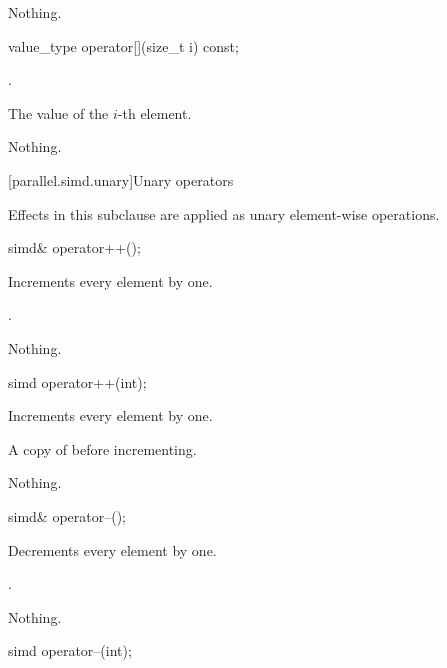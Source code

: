\begin{itemdescr}
\begin{itemdescr}
\begin{itemdescr}
  \throws Nothing.
\end{itemdescr}

\begin{itemdecl}
  value_type operator[](size_t i) const;
\end{itemdecl}

\begin{itemdescr}
  \requires
  .

  \returns
  The value of the $i$-th element.

  \throws Nothing.
\end{itemdescr}

[parallel.simd.unary]{Unary operators}

\pnum
Effects in this subclause are applied as unary element-wise operations.

\begin{itemdecl}
  simd& operator++();
\end{itemdecl}

\begin{itemdescr}
  \effects
  Increments every element by one.

  \returns
  .

  \throws Nothing.
\end{itemdescr}

\begin{itemdecl}
  simd operator++(int);
\end{itemdecl}

\begin{itemdescr}
  \effects
  Increments every element by one.

  \returns
  A copy of  before incrementing.

  \throws Nothing.
\end{itemdescr}

\begin{itemdecl}
  simd& operator--();
\end{itemdecl}

\begin{itemdescr}
  \effects
  Decrements every element by one.

  \returns
  .

  \throws Nothing.

\end{itemdescr}

\begin{itemdecl}
  simd operator--(int);
\end{itemdecl}


\end{itemdescr}
\end{itemdescr}
